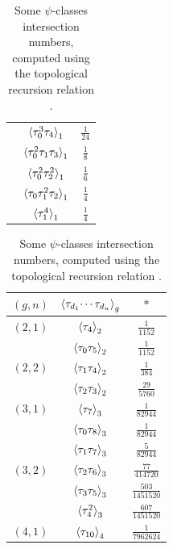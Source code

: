 \documentclass[11pt,reqno]{amsart}
\numberwithin{equation}{section}
\theoremstyle{plain}
\theoremstyle{definition}
\begin{document}
\begin{table}
{\begin{tabular}[t]{c|c|c}
    & $\braket{\tau_0^3 \tau_4}_1$ & $\tfrac{1}{24}$ \\
    & $\braket{\tau_0^2 \tau_1 \tau_3}_1$ & $\tfrac{1}{8}$ \\
    & $\braket{\tau_0^2 \tau_2^2}_1$ & $\tfrac{1}{6}$ \\
    & $\braket{\tau_0 \tau_1^2 \tau_2}_1$ & $\tfrac{1}{4}$ \\
    & $\braket{\tau_1^4}_1$ & $\tfrac{1}{4}$ \\
    \bottomrule
  \end{tabular}
  \hfill
  \begin{tabular}[t]{c|c|c}
    \toprule
    $(g,n)$ & $\braket{\tau_{d_1} \!\cdots \tau_{d_n}}_g$ & $\ast$ \\
    \midrule
    $(2,1)$ & $\braket{\tau_4}_2$ & $\tfrac{1}{1152}$ \\
    \midrule
    \multirow{3}{*}{$(2,2)$}
    & $\braket{\tau_0 \tau_5}_2$ & $\tfrac{1}{1152}$ \\
    & $\braket{\tau_1 \tau_4}_2$ & $\tfrac{1}{384}$ \\
    & $\braket{\tau_2 \tau_3}_2$ & $\tfrac{29}{5760}$ \\
    \midrule
    $(3,1)$ & $\braket{\tau_7}_3$ & $\tfrac{1}{82944}$ \\
    \midrule
    \multirow{5}{*}{$(3,2)$}
    & $\braket{\tau_0 \tau_8}_3$ & $\tfrac{1}{82944}$ \\
    & $\braket{\tau_1 \tau_7}_3$ & $\tfrac{5}{82944}$ \\
    & $\braket{\tau_2 \tau_6}_3$ & $\tfrac{77}{414720}$ \\
    & $\braket{\tau_3 \tau_5}_3$ & $\tfrac{503}{1451520}$ \\
    & $\braket{\tau_4^2}_3$ & $\tfrac{607}{1451520}$ \\
    \midrule
    $(4,1)$ & $\braket{\tau_{10}}_4$ & $\tfrac{1}{7962624}$ \\
    \bottomrule
  \end{tabular}
  \hfill
  }
  \caption{Some $\psi$-classes intersection numbers, computed using the topological recursion relation .}
  \label{table:psi:classes}
\end{table}
\end{document}
